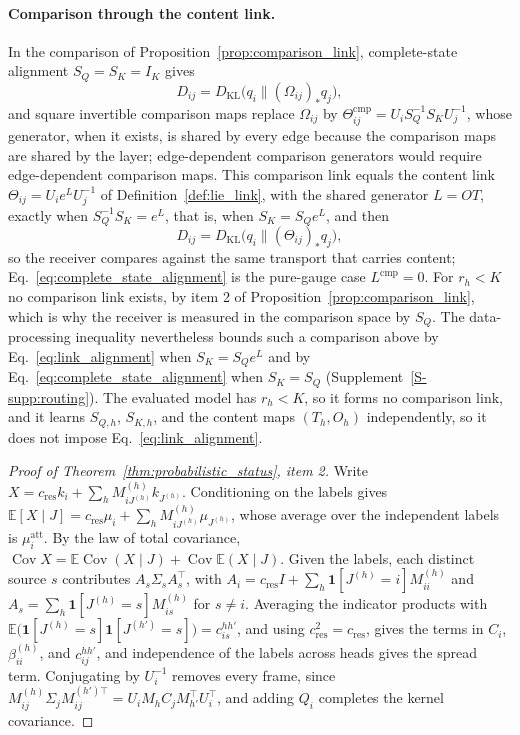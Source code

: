 \documentclass[twoside,11pt]{article}
\begin{document}
\paragraph{Comparison through the content link.}
In the comparison of Proposition~\ref{prop:comparison_link}, complete-state alignment $S_Q=S_K=I_K$ gives
\begin{equation}
D_{ij}=D_{\mathrm{KL}}\bigl(q_i\|(\Omega_{ij})_*q_j\bigr),
\label{eq:complete_state_alignment}
\end{equation}
and square invertible comparison maps replace $\Omega_{ij}$ by $\Theta^{\mathrm{cmp}}_{ij}=U_iS_Q^{-1}S_KU_j^{-1}$, whose generator, when it exists, is shared by every edge because the comparison maps are shared by the layer; edge-dependent comparison generators would require edge-dependent comparison maps. This comparison link equals the content link $\Theta_{ij}=U_ie^{L}U_j^{-1}$ of Definition~\ref{def:lie_link}, with the shared generator $L=OT$, exactly when $S_Q^{-1}S_K=e^{L}$, that is, when $S_K=S_Qe^{L}$, and then
\begin{equation}
D_{ij}=D_{\mathrm{KL}}\bigl(q_i\|(\Theta_{ij})_*q_j\bigr),
\label{eq:link_alignment}
\end{equation}
so the receiver compares against the same transport that carries content; Eq.~\eqref{eq:complete_state_alignment} is the pure-gauge case $L^{\mathrm{cmp}}=0$. For $r_h<K$ no comparison link exists, by item 2 of Proposition~\ref{prop:comparison_link}, which is why the receiver is measured in the comparison space by $S_Q$. The data-processing inequality nevertheless bounds such a comparison above by Eq.~\eqref{eq:link_alignment} when $S_K=S_Qe^{L}$ and by Eq.~\eqref{eq:complete_state_alignment} when $S_K=S_Q$ (Supplement~\ref{S-supp:routing}). The evaluated model has $r_h<K$, so it forms no comparison link, and it learns $S_{Q,h}$, $S_{K,h}$, and the content maps $(T_h,O_h)$ independently, so it does not impose Eq.~\eqref{eq:link_alignment}.

\begin{proof}[Proof of Theorem~\ref{thm:probabilistic_status}, item 2]
Write $X=c_{\mathrm{res}}k_i+\sum_hM_{iJ^{(h)}}^{(h)}k_{J^{(h)}}$. Conditioning on the labels gives $\mathbb E[X\mid J]=c_{\mathrm{res}}\mu_i+\sum_hM^{(h)}_{iJ^{(h)}}\mu_{J^{(h)}}$, whose average over the independent labels is $\mu_i^{\mathrm{att}}$. By the law of total covariance, $\operatorname{Cov}X=\mathbb E\operatorname{Cov}(X\mid J)+\operatorname{Cov}\mathbb E(X\mid J)$. Given the labels, each distinct source $s$ contributes $A_s\Sigma_sA_s^\top$, with $A_i=c_{\mathrm{res}}I+\sum_h\mathbf 1[J^{(h)}=i]M_{ii}^{(h)}$ and $A_s=\sum_h\mathbf 1[J^{(h)}=s]M_{is}^{(h)}$ for $s\ne i$. Averaging the indicator products with $\mathbb E\bigl(\mathbf 1[J^{(h)}=s]\mathbf 1[J^{(h')}=s]\bigr)=c_{is}^{hh'}$, and using $c_{\mathrm{res}}^2=c_{\mathrm{res}}$, gives the terms in $C_i$, $\beta_{ii}^{(h)}$, and $c_{ij}^{hh'}$, and independence of the labels across heads gives the spread term. Conjugating by $U_i^{-1}$ removes every frame, since $M_{ij}^{(h)}\Sigma_jM_{ij}^{(h')\top}=U_iM_hC_jM_{h'}^\top U_i^\top$, and adding $Q_i$ completes the kernel covariance.
\end{proof}
\end{document}
